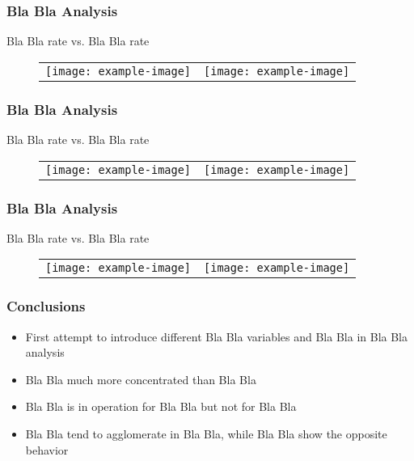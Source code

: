 \documentclass{beamer}
\begin{document}
\begin{frame}
\frametitle{Bla Bla Analysis}
\begin{center}
Bla Bla rate vs. Bla Bla rate
\end{center}
\begin{figure}
\begin{center}
\begin{tabular}{cc}
\texttt{[image: example-image]} &
\texttt{[image: example-image]}
\end{tabular}
\end{center}
\end{figure}
\end{frame}

\begin{frame}
\frametitle{Bla Bla Analysis}
\begin{center}
Bla Bla rate vs. Bla Bla rate
\end{center}
\begin{figure}
\begin{center}
\begin{tabular}{cc}
\texttt{[image: example-image]} &
\texttt{[image: example-image]}
\end{tabular}
\end{center}
\end{figure}
\end{frame}

\begin{frame}
\frametitle{Bla Bla Analysis}
\begin{center}
Bla Bla rate vs. Bla Bla rate
\end{center}
\begin{figure}
\begin{center}
\begin{tabular}{cc}
\texttt{[image: example-image]} &
\texttt{[image: example-image]}
\end{tabular}
\end{center}
\end{figure}
\end{frame}

\begin{frame}
\frametitle{Conclusions}
\begin{itemize}
\item First attempt to introduce different Bla Bla variables and Bla Bla in Bla Bla analysis \pause
\item Bla Bla much more concentrated than Bla Bla \pause
\item Bla Bla is in operation for Bla Bla but not for Bla Bla \pause
\item Bla Bla tend to agglomerate in Bla Bla, while Bla Bla show the opposite behavior
\end{itemize}
\end{frame}
\end{document}
